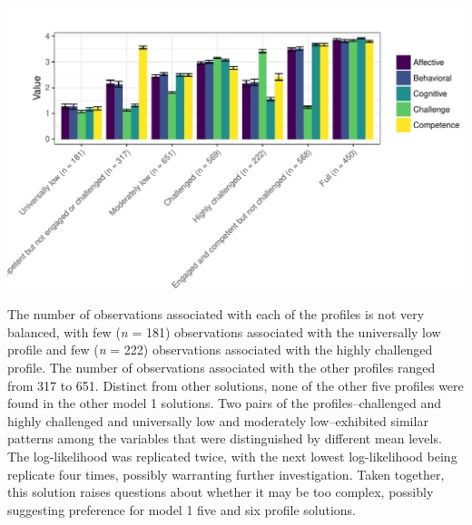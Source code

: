 \documentclass[]{book}
\theoremstyle{definition}
\theoremstyle{definition}
\theoremstyle{definition}
\theoremstyle{remark}
\begin{document}
\begin{center}\includegraphics[width=0.9\linewidth]{rosenberg-dissertation_files/figure-latex/m1_7p-2} \end{center}

The number of observations associated with each of the profiles is not
very balanced, with few (\emph{n} = 181) observations associated with
the universally low profile and few (\emph{n} = 222) observations
associated with the highly challenged profile. The number of
observations associated with the other profiles ranged from 317 to 651.
Distinct from other solutions, none of the other five profiles were
found in the other model 1 solutions. Two pairs of the
profiles--challenged and highly challenged and universally low and
moderately low--exhibited similar patterns among the variables that were
distinguished by different mean levels. The log-likelihood was
replicated twice, with the next lowest log-likelihood being replicate
four times, possibly warranting further investigation. Taken together,
this solution raises questions about whether it may be too complex,
possibly suggesting preference for model 1 five and six profile
solutions.


\end{document}
